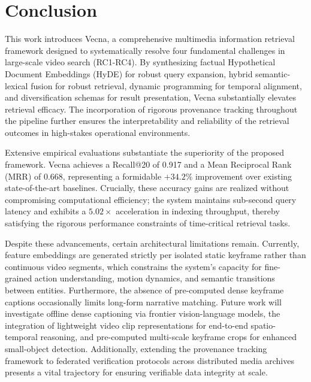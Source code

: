 \section{Conclusion}\label{sec:conclusion}

This work introduces Vecna, a comprehensive multimedia information retrieval framework designed to systematically resolve four fundamental challenges in large-scale video search (RC1-RC4). By synthesizing factual Hypothetical Document Embeddings (HyDE) for robust query expansion, hybrid semantic-lexical fusion for robust retrieval, dynamic programming for temporal alignment, and diversification schemas for result presentation, Vecna substantially elevates retrieval efficacy. The incorporation of rigorous provenance tracking throughout the pipeline further ensures the interpretability and reliability of the retrieval outcomes in high-stakes operational environments.

Extensive empirical evaluations substantiate the superiority of the proposed framework. Vecna achieves a Recall@20 of 0.917 and a Mean Reciprocal Rank (MRR) of 0.668, representing a formidable $+34.2\%$ improvement over existing state-of-the-art baselines. Crucially, these accuracy gains are realized without compromising computational efficiency; the system maintains sub-second query latency and exhibits a $5.02\times$ acceleration in indexing throughput, thereby satisfying the rigorous performance constraints of time-critical retrieval tasks.

Despite these advancements, certain architectural limitations remain. Currently, feature embeddings are generated strictly per isolated static keyframe rather than continuous video segments, which constrains the system's capacity for fine-grained action understanding, motion dynamics, and semantic transitions between entities. Furthermore, the absence of pre-computed dense keyframe captions occasionally limits long-form narrative matching. Future work will investigate offline dense captioning via frontier vision-language models, the integration of lightweight video clip representations for end-to-end spatio-temporal reasoning, and pre-computed multi-scale keyframe crops for enhanced small-object detection. Additionally, extending the provenance tracking framework to federated verification protocols across distributed media archives presents a vital trajectory for ensuring verifiable data integrity at scale.
